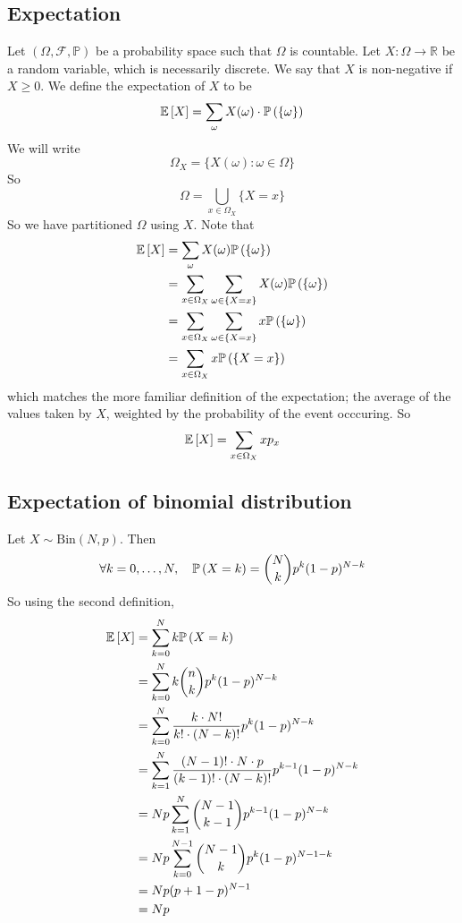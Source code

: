 \subsection{Expectation}
Let \((\Omega, \mathcal F, \mathbb P)\) be a probability space such that \(\Omega\) is countable.
Let \(X \colon \Omega \to \mathbb R\) be a random variable, which is necessarily discrete.
We say that \(X\) is non-negative if \(X \geq 0\).
We define the expectation of \(X\) to be
\[
	\mathbb{E}\left[{X}\right] = \sum_\omega X(\omega) \cdot \mathbb{P}\left({\{ \omega \}}\right)
\]
We will write
\[
	\Omega_X = \{ X(\omega) \colon \omega \in \Omega \}
\]
So
\[
	\Omega = \bigcup_{x \in \Omega_X} \{ X = x \}
\]
So we have partitioned \(\Omega\) using \(X\).
Note that
\begin{align*}
	\mathbb{E}\left[{X}\right] &= \sum_\omega X(\omega) \mathbb{P}\left({\{\omega\}}\right) \\
	&= \sum_{x \in \Omega_X} \sum_{\omega \in \{ X = x\}} X(\omega) \mathbb{P}\left({\{\omega\}}\right) \\
	&= \sum_{x \in \Omega_X} \sum_{\omega \in \{ X = x\}} x \mathbb{P}\left({\{\omega\}}\right) \\
	&= \sum_{x \in \Omega_X} x\mathbb{P}\left({\{X = x \}}\right)
\end{align*}
which matches the more familiar definition of the expectation; the average of the values taken by \(X\), weighted by the probability of the event occcuring.
So
\[
	\mathbb{E}\left[{X}\right] = \sum_{x \in \Omega_X} x p_x
\]

\subsection{Expectation of binomial distribution}
Let \(X \sim \mathrm{Bin}(N, p)\).
Then
\[
	\forall k = 0, \dots, N,\quad \mathbb{P}\left({X = k}\right) = \binom{N}{k} p^k (1-p)^{N-k}
\]
So using the second definition,
\begin{align*}
	\mathbb{E}\left[{X}\right] & = \sum_{k=0}^N k \mathbb{P}\left({X = k}\right)                            \\
	           & = \sum_{k=0}^N k \binom{n}{k} p^k (1-p)^{N-k}            \\
	           & = \sum_{k=0}^N \frac{k \cdot N!}{k!
	\cdot (N-k)!} p^k (1-p)^{N-k}                                         \\
	           & = \sum_{k=1}^N \frac{(N-1)!
		\cdot N \cdot p}{(k-1)!
	\cdot (N-k)!} p^{k-1} (1-p)^{N-k}                                     \\
	           & = Np \sum_{k=1}^N \binom{N-1}{k-1} p^{k-1} (1-p)^{N-k}   \\
	           & = Np \sum_{k=0}^{N-1} \binom{N-1}{k} p^{k} (1-p)^{N-1-k} \\
	           & = Np (p + 1 - p)^{N-1}                                   \\
	           & = Np
\end{align*}

